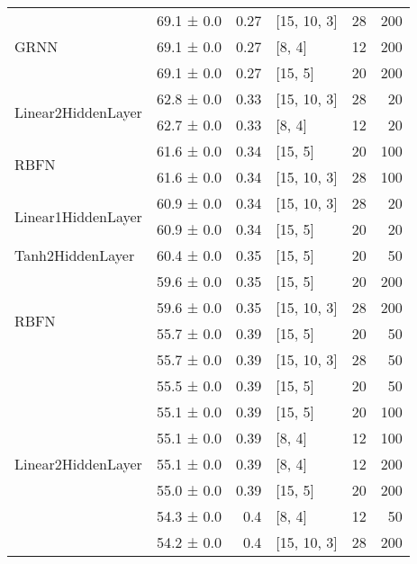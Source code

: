 \begin{table*}[h]
\begin{tabular}{llrlrr}
 \hline
\multirow{3}{*}{GRNN}         & 69.1 ± 0.0 &  0.27 & [15, 10, 3]    &         28 &      200 \\
         & 69.1 ± 0.0 &  0.27 & [8, 4]         &         12 &      200 \\
         & 69.1 ± 0.0 &  0.27 & [15, 5]        &         20 &      200 \\
 \hline
\multirow{2}{*}{Linear2HiddenLayer}         & 62.8 ± 0.0 &  0.33 & [15, 10, 3]    &         28 &       20 \\
         & 62.7 ± 0.0 &  0.33 & [8, 4]         &         12 &       20 \\
 \hline
\multirow{2}{*}{RBFN}         & 61.6 ± 0.0 &  0.34 & [15, 5]        &         20 &      100 \\
         & 61.6 ± 0.0 &  0.34 & [15, 10, 3]    &         28 &      100 \\
 \hline
\multirow{2}{*}{Linear1HiddenLayer}         & 60.9 ± 0.0 &  0.34 & [15, 10, 3]    &         28 &       20 \\
         & 60.9 ± 0.0 &  0.34 & [15, 5]        &         20 &       20 \\
 \hline
Tanh2HiddenLayer         & 60.4 ± 0.0 &  0.35 & [15, 5]        &         20 &       50 \\
 \hline
\multirow{4}{*}{RBFN}         & 59.6 ± 0.0 &  0.35 & [15, 5]        &         20 &      200 \\
         & 59.6 ± 0.0 &  0.35 & [15, 10, 3]    &         28 &      200 \\
         & 55.7 ± 0.0 &  0.39 & [15, 5]        &         20 &       50 \\
         & 55.7 ± 0.0 &  0.39 & [15, 10, 3]    &         28 &       50 \\
 \hline
\multirow{7}{*}{Linear2HiddenLayer}         & 55.5 ± 0.0 &  0.39 & [15, 5]        &         20 &       50 \\
         & 55.1 ± 0.0 &  0.39 & [15, 5]        &         20 &      100 \\
         & 55.1 ± 0.0 &  0.39 & [8, 4]         &         12 &      100 \\
         & 55.1 ± 0.0 &  0.39 & [8, 4]         &         12 &      200 \\
         & 55.0 ± 0.0 &  0.39 & [15, 5]        &         20 &      200 \\
         & 54.3 ± 0.0 &  0.4  & [8, 4]         &         12 &       50 \\
         & 54.2 ± 0.0 &  0.4  & [15, 10, 3]    &         28 &      200 \\

\end{tabular}
\end{table*}
